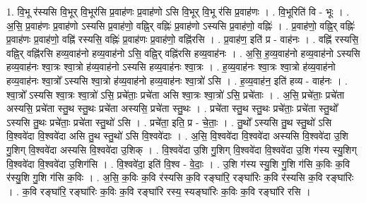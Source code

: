 \documentclass[17pt]{extarticle}
\begin{document}
1. वि॒भू र॑स्यसि वि॒भूर् वि॒भूर॑सि प्र॒वाह॑णः प्र॒वाह॑णो ऽसि वि॒भूर् वि॒भू र॑सि प्र॒वाह॑णः । . वि॒भूरिति॑ वि - भूः । . अ॒सि॒ प्र॒वाह॑णः प्र॒वाह॑णो ऽस्यसि प्र॒वाह॑णो॒ वह्नि॒र् वह्निः॑ प्र॒वाह॑णो ऽस्यसि प्र॒वाह॑णो॒ वह्निः॑ । . प्र॒वाह॑णो॒ वह्नि॒र् वह्निः॑ प्र॒वाह॑णः प्र॒वाह॑णो॒ वह्नि॑ रस्यसि॒ वह्निः॑ प्र॒वाह॑णः प्र॒वाह॑णो॒ वह्नि॑रसि । . प्र॒वाह॑ण॒ इति॑ प्र - वाह॑नः । . वह्नि॑ रस्यसि॒ वह्नि॒र् वह्नि॑रसि हव्य॒वाह॑नो हव्य॒वाह॑नो ऽसि॒ वह्नि॒र् वह्नि॑रसि हव्य॒वाह॑नः । . अ॒सि॒ ह॒व्य॒वाह॑नो हव्य॒वाह॑नो ऽस्यसि हव्य॒वाह॑नः श्वा॒त्रः श्वा॒त्रो ह॑व्य॒वाह॑नो ऽस्यसि हव्य॒वाह॑नः श्वा॒त्रः । . ह॒व्य॒वाह॑नः श्वा॒त्रः श्वा॒त्रो ह॑व्य॒वाह॑नो हव्य॒वाह॑नः श्वा॒त्रो᳚ ऽस्यसि श्वा॒त्रो ह॑व्य॒वाह॑नो हव्य॒वाह॑नः श्वा॒त्रो॑ ऽसि । . ह॒व्य॒वाह॑न॒ इति॑ हव्य - वाह॑नः । . श्वा॒त्रो᳚ ऽस्यसि श्वा॒त्रः श्वा॒त्रो॑ ऽसि॒ प्रचे॑ताः॒ प्रचे॑ता असि श्वा॒त्रः श्वा॒त्रो॑ ऽसि॒ प्रचे॑ताः । . अ॒सि॒ प्रचे॑ताः॒ प्रचे॑ता अस्यसि॒ प्रचे॑ता स्तु॒थ स्तु॒थः प्रचे॑ता अस्यसि॒ प्रचे॑ता स्तु॒थः । . प्रचे॑ता स्तु॒थ स्तु॒थः प्रचे॑ताः॒ प्रचे॑ता स्तु॒थो᳚ ऽस्यसि तु॒थः प्रचे॑ताः॒ प्रचे॑ता स्तु॒थो॑ ऽसि । . प्रचे॑ता॒ इति॒ प्र - चे॒ताः॒ । . तु॒थो᳚ ऽस्यसि तु॒थ स्तु॒थो॑ ऽसि वि॒श्ववे॑दा वि॒श्ववे॑दा असि तु॒थ स्तु॒थो॑ ऽसि वि॒श्ववे॑दाः । . अ॒सि॒ वि॒श्ववे॑दा वि॒श्ववे॑दा अस्यसि वि॒श्ववे॑दा उ॒शि गु॒शिग् वि॒श्ववे॑दा अस्यसि वि॒श्ववे॑दा उ॒शिक् । . वि॒श्ववे॑दा उ॒शि गु॒शिग् वि॒श्ववे॑दा वि॒श्ववे॑दा उ॒शि ग॑स्य स्यु॒शिग् वि॒श्ववे॑दा वि॒श्ववे॑दा उ॒शिग॑सि । . वि॒श्ववे॑दा॒ इति॑ वि॒श्व - वे॒दाः॒ । . उ॒शि ग॑स्य स्यु॒शि गु॒शि ग॑सि क॒विः क॒वि र॑स्यु॒शि गु॒शि ग॑सि क॒विः । . अ॒सि॒ क॒विः क॒वि र॑स्यसि क॒वि रङ्घा॑रि॒ रङ्घा॑रिः क॒वि र॑स्यसि क॒वि रङ्घा॑रिः । . क॒वि रङ्घा॑रि॒ रङ्घा॑रिः क॒विः क॒वि रङ्घा॑रि रस्य॒ स्यङ्घा॑रिः क॒विः क॒वि रङ्घा॑रि रसि । \newline
\end{document}
